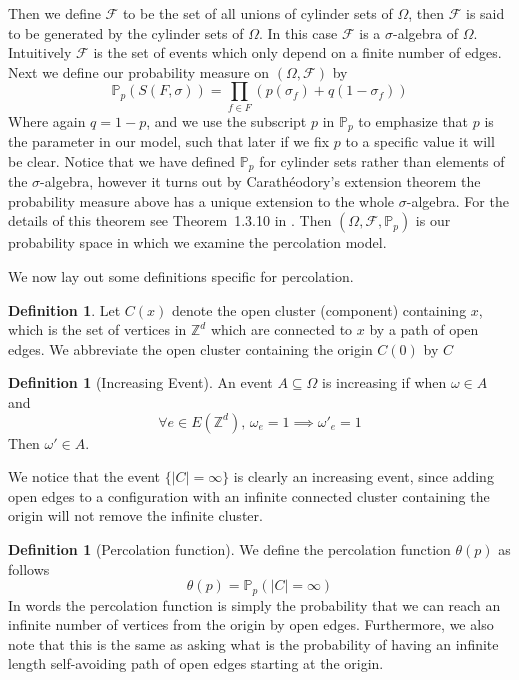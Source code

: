 \documentclass[a4paper,11pt]{article}
\theoremstyle{definition}
\newtheorem{definition}[theorem]{Definition}
\newcommand{\ints}{\mathbb{Z}}
\newcommand{\sigalg}{$\sigma$-algebra }
\newcommand{\prob}{\mathbb{P}_p}
\begin{document}
Then we define $\mathcal{F}$ to be the set of all unions of cylinder sets of $\Omega$, then $\mathcal{F}$ is said to be generated by the cylinder sets of $\Omega$.
In this case $\mathcal{F}$ is a \sigalg of $\Omega$. Intuitively $\mathcal{F}$ is the set of events which only depend on a finite number of edges.\\
Next we define our probability measure on $(\Omega, \mathcal{F})$ by 
$$\prob(S(F,\sigma)) = \prod_{f \in F} (p(\sigma_f) + q(1-\sigma_f)) $$
Where again $q = 1-p$, and we use the subscript $p$ in $\prob$ to emphasize that $p$ is the parameter in our model, such that later if we fix $p$ to a specific value it will be clear.
Notice that we have defined $\prob$ for cylinder sets rather than elements of the $\sigma$-algebra, however it turns out by
Carathéodory's extension theorem the probability measure above has a unique extension to the whole $\sigma$-algebra.
For the details of this theorem see Theorem~1.3.10 in \cite{ash2000probability}.
Then $(\Omega, \mathcal{F}, \prob)$ is our probability space in which we examine the percolation model.


We now lay out some definitions specific for percolation.
\begin{definition}
	Let $C(x)$ denote the open cluster (component) containing $x$, which is the set of vertices in $\ints^d$ which are connected to $x$ by a path of open edges.
	We abbreviate the open cluster containing the origin $C(0)$ by $C$
\end{definition}

\begin{definition}[Increasing Event]
	An event $ A \subseteq \Omega$ is increasing if when $\omega \in A$ and
	$$\forall e \in E(\ints^d) \text{, } \omega_e = 1 \implies \omega'_e = 1$$
	Then $\omega' \in A$. 
	\end{definition} 

	We notice that the event $\{|C| = \infty\}$ is clearly an increasing event, since adding open edges to a configuration with an infinite connected cluster containing the origin will not remove the infinite cluster.

\begin{definition}[Percolation function]
	We define the percolation function $\theta(p)$ as follows
	$$\theta(p) = \prob(|C| = \infty)$$
	In words the percolation function is simply the probability that we can reach an infinite number of vertices from the origin by open edges. 
	Furthermore, we also note that this is the same as asking what is the probability of having an infinite length self-avoiding path of open edges starting at the origin.
\end{definition}
\end{document}
